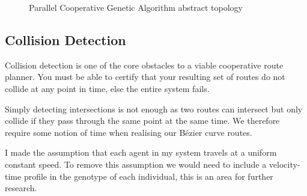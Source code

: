 \begin{figure}
  \centering
\caption{\label{fig:PCGA} Parallel Cooperative Genetic Algorithm abstract topology}
\end{figure}

\subsection{Collision Detection}
\label{subsec:col-detection}

Collision detection is one of the core obstacles to a viable cooperative route planner. You must be able to certify that your resulting set of routes do not collide at any point in time, else the entire system fails.

Simply detecting intersections is not enough as two routes can intersect but only collide if they pass through the same point at the same time. We therefore require some notion of time when realising our Bézier curve routes.

I made the assumption that each agent in my system travels at a uniform constant speed. To remove this assumption we would need to include a velocity-time profile in the genotype of each individual, this is an area for further research.


